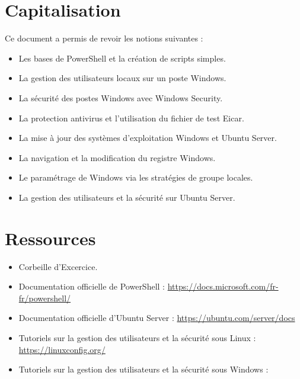 \newpage

\section*{Capitalisation}
\noindent Ce document a permis de revoir les notions suivantes :
\begin{itemize}
  \item Les bases de PowerShell et la création de scripts simples.
  \item La gestion des utilisateurs locaux sur un poste Windows.
  \item La sécurité des postes Windows avec Windows Security.
  \item La protection antivirus et l'utilisation du fichier de test Eicar.
  \item La mise à jour des systèmes d'exploitation Windows et Ubuntu Server.
  \item La navigation et la modification du registre Windows.
  \item Le paramétrage de Windows via les stratégies de groupe locales.
  \item La gestion des utilisateurs et la sécurité sur Ubuntu Server.
\end{itemize}

\section*{Ressources}
\begin{itemize}
  \item Corbeille d'Excercice.
  \item Documentation officielle de PowerShell : 
    \url{https://docs.microsoft.com/fr-fr/powershell/}
  \item Documentation officielle d'Ubuntu Server :
    \url{https://ubuntu.com/server/docs}
  \item Tutoriels sur la gestion des utilisateurs et la sécurité sous Linux :
    \url{https://linuxconfig.org/}
  \item Tutoriels sur la gestion des utilisateurs et la sécurité sous Windows :
\end{itemize}